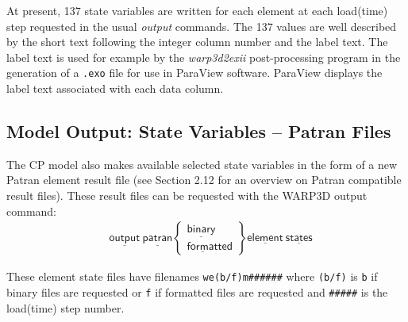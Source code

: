 \documentclass[11pt]{report}
\numberwithin{equation}{section}
\newcommand{\ttt} {\texttt}  %
\newcommand{\ul} {\underline}
\newcommand{\hv} {\mathsf}   %
\newcommand{\ti}{\emph}
\newcommand{\noi}{\noindent}
\begin{document}
\noi At present, 137 state variables are written for each element at each load(time) step requested
in the usual \ti{output} commands. The 137 values are well described by the short text following the 
integer column number and the label text. The label text is used for example by the \ti{warp3d2exii}
post-processing program in the generation of a \ttt{.exo} file for use in ParaView software. ParaView
displays the label text associated with each data column.  


\subsection{Model Output: State Variables -- Patran Files}
The CP model also makes available selected state variables in the form of
a new Patran element result file (see Section 2.12 for an overview on 
Patran compatible result files).  These result files can be requested with the
WARP3D output command:
\begin{align*}
& \hv{\ul{output}\ \ul{patran}   }
\begin{Bmatrix}
\hv{\ul{binary}} \\ \hv{\ul{format}ted} 
\end{Bmatrix} 
\hv{\ul{element}\ \ul{states} } 
\end{align*}

\noindent These element state files have filenames \small{\ttt{we(b/f)m\#\#\#\#\#\#}}
\normalsize
where \ttt{(b/f)} is \ttt{b} if binary files are requested or 
\ttt{f} if formatted files are
requested and  \verb|#####| is the load(time) step number.  
\end{document}
